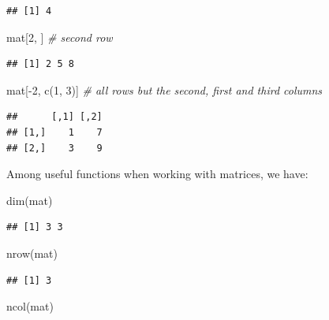 \documentclass[
]{book}
\newenvironment{Shaded}{\begin{snugshade}}{\end{snugshade}}
\newcommand{\CommentTok}[1]{\textcolor[rgb]{0.56,0.35,0.01}{\textit{#1}}}
\newcommand{\DecValTok}[1]{\textcolor[rgb]{0.00,0.00,0.81}{#1}}
\newcommand{\FunctionTok}[1]{\textcolor[rgb]{0.00,0.00,0.00}{#1}}
\newcommand{\NormalTok}[1]{#1}
\newcommand{\SpecialCharTok}[1]{\textcolor[rgb]{0.00,0.00,0.00}{#1}}
\begin{document}
\begin{verbatim}
## [1] 4
\end{verbatim}

\begin{Shaded}
\begin{Highlighting}[]
\NormalTok{mat[}\DecValTok{2}\NormalTok{, ] }\CommentTok{\# second row}
\end{Highlighting}
\end{Shaded}

\begin{verbatim}
## [1] 2 5 8
\end{verbatim}

\begin{Shaded}
\begin{Highlighting}[]
\NormalTok{mat[}\SpecialCharTok{{-}}\DecValTok{2}\NormalTok{, }\FunctionTok{c}\NormalTok{(}\DecValTok{1}\NormalTok{, }\DecValTok{3}\NormalTok{)] }\CommentTok{\# all rows but the second, first and third columns}
\end{Highlighting}
\end{Shaded}

\begin{verbatim}
##      [,1] [,2]
## [1,]    1    7
## [2,]    3    9
\end{verbatim}

Among useful functions when working with matrices, we have:

\begin{Shaded}
\begin{Highlighting}[]
\FunctionTok{dim}\NormalTok{(mat) }
\end{Highlighting}
\end{Shaded}

\begin{verbatim}
## [1] 3 3
\end{verbatim}

\begin{Shaded}
\begin{Highlighting}[]
\FunctionTok{nrow}\NormalTok{(mat)}
\end{Highlighting}
\end{Shaded}

\begin{verbatim}
## [1] 3
\end{verbatim}

\begin{Shaded}
\begin{Highlighting}[]
\FunctionTok{ncol}\NormalTok{(mat)}
\end{Highlighting}
\end{Shaded}
\end{document}
